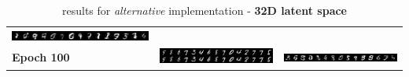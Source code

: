 \documentclass[10pt,a4paper]{article}
\begin{document}
\begin{table}
\begin{tabular}{p{}p{}p{}}
{      \includegraphics[width=1.3\linewidth]{images/l_32/generated49.png}}\\
      \textbf{Epoch 100} & \parbox[c]{10em}{
      \hfill\includegraphics[width=1.3\linewidth]{images/l_32/output99.png}} & \parbox[c]{10em}{
      \includegraphics[width=1.3\linewidth]{images/l_32/generated99.png}}\\
      \hline
  \end{tabular}
  \caption{results for \textit{alternative} implementation - \textbf{32D latent space}} \label{tab:loglike32d}
\end{table}
\end{document}

